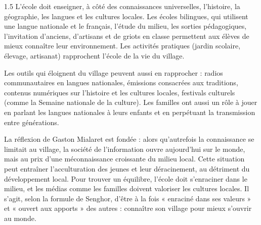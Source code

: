 \documentclass[12pt]{article}
\begin{document}
\begin{spacing}{1.5}
L'école doit enseigner, à côté des connaissances universelles, l'histoire, la géographie, les langues et les cultures locales. Les écoles bilingues, qui utilisent une langue nationale et le français, l'étude du milieu, les sorties pédagogiques, l'invitation d'anciens, d'artisans et de griots en classe permettent aux élèves de mieux connaître leur environnement. Les activités pratiques (jardin scolaire, élevage, artisanat) rapprochent l'école de la vie du village.

Les outils qui éloignent du village peuvent aussi en rapprocher : radios communautaires en langues nationales, émissions consacrées aux traditions, contenus numériques sur l'histoire et les cultures locales, festivals culturels (comme la Semaine nationale de la culture). Les familles ont aussi un rôle à jouer en parlant les langues nationales à leurs enfants et en perpétuant la transmission entre générations.


La réflexion de Gaston Mialaret est fondée : alors qu'autrefois la connaissance se limitait au village, la société de l'information ouvre aujourd'hui sur le monde, mais au prix d'une méconnaissance croissante du milieu local. Cette situation peut entraîner l'acculturation des jeunes et leur déracinement, au détriment du développement local. Pour trouver un équilibre, l'école doit s'enraciner dans le milieu, et les médias comme les familles doivent valoriser les cultures locales. Il s'agit, selon la formule de Senghor, d'être à la fois « enraciné dans ses valeurs » et « ouvert aux apports » des autres : connaître son village pour mieux s'ouvrir au monde.

\end{spacing}
\end{document}
